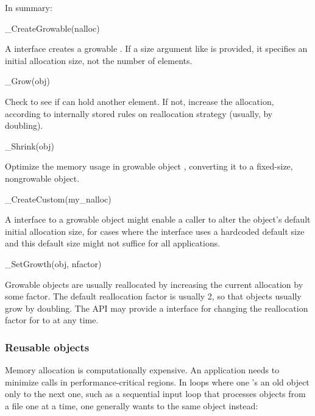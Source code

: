 In summary: 

\begin{sreapi}
\hypertarget{ifc:CreateGrowable}
{\item[\_CreateGrowable(nalloc)]}

A  interface creates a growable
. If a size argument like  is provided, it
specifies an initial allocation size, not the number of elements.

\hypertarget{ifc:Grow}
{\item[\_Grow(obj)]}

Check to see if  can hold another element. If not, increase
the allocation, according to internally stored rules on reallocation
strategy (usually, by doubling).

\hypertarget{ifc:Shrink}
{\item[\_Shrink(obj)]}

Optimize the memory usage in growable object , converting
it to a fixed-size, nongrowable object.

\hypertarget{ifc:CreateCustom}
{\item[\_CreateCustom(my\_nalloc)]}

A  interface to a growable object might enable
a caller to alter the object's default initial allocation size, for
cases where the  interface uses a hardcoded default
size and this default size might not suffice for all applications.

\hypertarget{ifc:SetGrowth}
{\item[\_SetGrowth(obj, nfactor)]}

Growable objects are usually reallocated by increasing the current
allocation by some factor. The default reallocation factor is usually
2, so that objects usually grow by doubling. The API may provide a
 interface for changing the reallocation factor
for  to  at any time.
\end{sreapi}




\subsubsection{Reusable objects}

Memory allocation is computationally expensive. An application needs
to minimize  calls in performance-critical
regions. In loops where one 's an old object only
to  the next one, such as a sequential input loop
that processes objects from a file one at a time, one generally wants
to  the same object instead:

